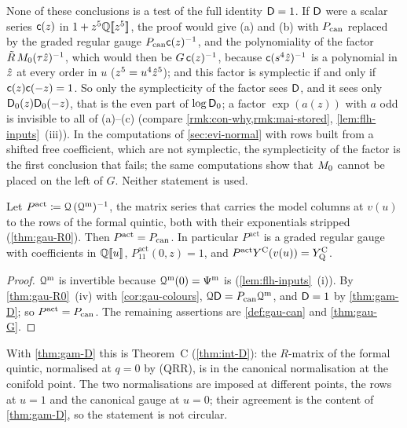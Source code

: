 None of these conclusions is a test of the full identity $\mathsf{D}=1$. If $\mathsf{D}$ were a scalar series $\mathsf{c}(z)$ in $1+z^5\mathbb{Q}[\![ z^5 ]\!]$, the proof would give (a) and (b) with $P_{\mathrm{can}}$ replaced by the graded regular gauge $P_{\mathrm{can}}\mathsf{c}(z)^{-1}$, and the polynomiality of the factor $\tilde R\,M_{0}(\tau\hat{z})^{-1}$, which would then be $G\,\mathsf{c}(z)^{-1}$, because $\mathsf{c}(s^4\hat{z})^{-1}$ is a polynomial in $\hat{z}$ at every order in $u$ ($z^5=u^4\hat{z}^5$); and this factor is symplectic if and only if $\mathsf{c}(z)\mathsf{c}(-z)=1$. So only the symplecticity of the factor sees $\mathsf{D}$, and it sees only $\mathsf{D}_0(z)\mathsf{D}_0(-z)$, that is the even part of $\log\mathsf{D}_0$; a factor $\exp(a(z))$ with $a$ odd is invisible to all of (a)--(c) (compare \cref{rmk:con-why,rmk:mai-stored}, \cref{lem:flh-inputs}~(iii)). In the computations of \cref{sec:evi-normal} with rows built from a shifted free coefficient, which are not symplectic, the symplecticity of the factor is the first conclusion that fails; the same computations show that $M_{0}$ cannot be placed on the left of $G$. Neither statement is used.

\begin{cor}
\label{cor:mai-actual}
Let $P^{\mathrm{act}}\coloneqq\mathcal{Q}\,(\mathcal{Q}^{\mathrm m})^{-1}$, the matrix series that carries the model columns at $v(u)$ to the rows of the formal quintic, both with their exponentials stripped (\cref{thm:gau-R0}). Then $P^{\mathrm{act}}=P_{\mathrm{can}}$. In particular $P^{\mathrm{act}}$ is a graded regular gauge with coefficients in $\mathbb{Q}[\![ u ]\!]$, $P^{\mathrm{act}}_{11}(0,z)=1$, and $P^{\mathrm{act}}Y^{\mathrm{C}}(v(u))=Y^{\mathrm{C}}_{\mathrm{Q}}$.
\end{cor}

\begin{proof}
$\mathcal{Q}^{\mathrm m}$ is invertible because $\mathcal{Q}^{\mathrm m}(0)=\Psi^{\mathrm m}$ is (\cref{lem:flh-inputs}~(i)). By \cref{thm:gau-R0}~(iv) with \cref{cor:gau-colours}, $\mathcal{Q}\mathsf{D}=P_{\mathrm{can}}\mathcal{Q}^{\mathrm m}$, and $\mathsf{D}=1$ by \cref{thm:gam-D}; so $P^{\mathrm{act}}=P_{\mathrm{can}}$. The remaining assertions are \cref{def:gau-can} and \cref{thm:gau-G}.
\end{proof}

With \cref{thm:gam-D} this is Theorem~C (\cref{thm:int-D}): the $R$-matrix of the formal quintic, normalised at $q=0$ by (QRR), is in the canonical normalisation at the conifold point. The two normalisations are imposed at different points, the rows at $u=1$ and the canonical gauge at $u=0$; their agreement is the content of \cref{thm:gam-D}, so the statement is not circular.

